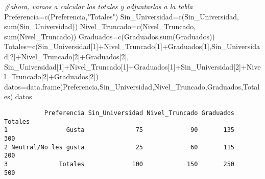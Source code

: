 \documentclass[
  a4paper,
  oneside,
  openany]{book}
\newenvironment{Shaded}{\begin{snugshade}}{\end{snugshade}}
\newcommand{\CommentTok}[1]{\textcolor[rgb]{0.56,0.35,0.01}{\textit{#1}}}
\newcommand{\DecValTok}[1]{\textcolor[rgb]{0.00,0.00,0.81}{#1}}
\newcommand{\FunctionTok}[1]{\textcolor[rgb]{0.00,0.00,0.00}{#1}}
\newcommand{\NormalTok}[1]{#1}
\newcommand{\OtherTok}[1]{\textcolor[rgb]{0.56,0.35,0.01}{#1}}
\newcommand{\SpecialCharTok}[1]{\textcolor[rgb]{0.00,0.00,0.00}{#1}}
\newcommand{\StringTok}[1]{\textcolor[rgb]{0.31,0.60,0.02}{#1}}
\begin{document}
\begin{Shaded}
\begin{Highlighting}[]
\CommentTok{\#ahora, vamos a calcular los totales y adjuntarlos a la tabla}
\NormalTok{Preferencia}\OtherTok{=}\FunctionTok{c}\NormalTok{(Preferencia,}\StringTok{"Totales"}\NormalTok{)}
\NormalTok{Sin\_Universidad}\OtherTok{=}\FunctionTok{c}\NormalTok{(Sin\_Universidad, }\FunctionTok{sum}\NormalTok{(Sin\_Universidad))}
\NormalTok{Nivel\_Truncado}\OtherTok{=}\FunctionTok{c}\NormalTok{(Nivel\_Truncado, }\FunctionTok{sum}\NormalTok{(Nivel\_Truncado))}
\NormalTok{Graduados}\OtherTok{=}\FunctionTok{c}\NormalTok{(Graduados,}\FunctionTok{sum}\NormalTok{(Graduados))}
\NormalTok{Totales}\OtherTok{=}\FunctionTok{c}\NormalTok{(Sin\_Universidad[}\DecValTok{1}\NormalTok{]}\SpecialCharTok{+}\NormalTok{Nivel\_Truncado[}\DecValTok{1}\NormalTok{]}\SpecialCharTok{+}\NormalTok{Graduados[}\DecValTok{1}\NormalTok{],Sin\_Universidad[}\DecValTok{2}\NormalTok{]}\SpecialCharTok{+}\NormalTok{Nivel\_Truncado[}\DecValTok{2}\NormalTok{]}\SpecialCharTok{+}\NormalTok{Graduados[}\DecValTok{2}\NormalTok{],}
\NormalTok{           Sin\_Universidad[}\DecValTok{1}\NormalTok{]}\SpecialCharTok{+}\NormalTok{Nivel\_Truncado[}\DecValTok{1}\NormalTok{]}\SpecialCharTok{+}\NormalTok{Graduados[}\DecValTok{1}\NormalTok{]}\SpecialCharTok{+}\NormalTok{Sin\_Universidad[}\DecValTok{2}\NormalTok{]}\SpecialCharTok{+}\NormalTok{Nivel\_Truncado[}\DecValTok{2}\NormalTok{]}\SpecialCharTok{+}\NormalTok{Graduados[}\DecValTok{2}\NormalTok{])}
\NormalTok{datos}\OtherTok{=}\FunctionTok{data.frame}\NormalTok{(Preferencia,Sin\_Universidad,Nivel\_Truncado,Graduados,Totales)}
\NormalTok{datos}
\end{Highlighting}
\end{Shaded}

\begin{verbatim}
           Preferencia Sin_Universidad Nivel_Truncado Graduados Totales
1                Gusta              75             90       135     300
2 Neutral/No les gusta              25             60       115     200
3              Totales             100            150       250     500
\end{verbatim}
\end{document}
